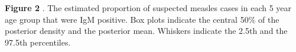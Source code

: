 \textbf{Figure 2} . The estimated proportion of suspected measles cases
in each 5 year age group that were IgM positive. Box plots indicate the central 50\% of the posterior density and the posterior mean. Whiskers indicate the 2.5th and the
97.5th percentiles.